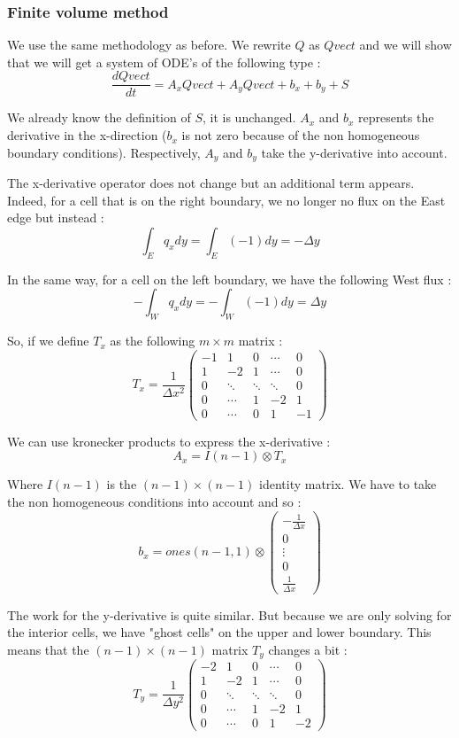 \subsubsection{Finite volume method}
We use the same methodology as before. We rewrite $Q$ as $Qvect$ and we will show that we will get a system of ODE's of the following type : 
$$\frac{dQvect}{dt} = A_xQvect+A_yQvect+b_x+b_y+S$$

We already know the definition of $S$, it is unchanged. $A_x$ and $b_x$ represents the derivative in the x-direction ($b_x$ is not zero because of the non homogeneous boundary conditions). Respectively, $A_y$ and $b_y$ take the y-derivative into account.

The x-derivative operator does not change but an additional term appears. Indeed, for a cell that is on the right boundary, we no longer no flux on the East edge but instead : 
$$\int_E q_xdy = \int_E (-1)dy = -\Delta y$$ 

In the same way, for a cell on the left boundary, we have the following West flux :
$$-\int_Wq_xdy=-\int_W(-1)dy = \Delta y$$

So, if we define $T_x$ as the following $m\times m$ matrix :
$$T_x = \frac{1}{\Delta x^2}\left(\begin{array}{ccccc}
-1 & 1 & 0 & \cdots & 0 \\ 
1 & -2 & 1 & \cdots & 0 \\ 
0& \ddots & \ddots & \ddots & 0 \\ 
0 & \cdots & 1 & -2 & 1 \\
0 & \cdots & 0 & 1 & -1
\end{array}\right) $$

We can use kronecker products to express the x-derivative :
$$A_x = I(n-1)\otimes T_x$$

Where $I(n-1)$ is the $(n-1)\times (n-1)$ identity matrix. We have to take the non homogeneous conditions into account and so :
$$b_x = ones(n-1,1) \otimes \left(\begin{array}{c}
-\frac{1}{\Delta x} \\ 
0 \\ 
\vdots \\ 
0 \\ 
\frac{1}{\Delta x}
\end{array}\right)$$

The work for the y-derivative is quite similar. But because we are only solving for the interior cells, we have "ghost cells" on the upper and lower boundary. This means that the $(n-1)\times (n-1)$ matrix $T_y$ changes a bit : 
$$T_y = \frac{1}{\Delta y^2}\left(\begin{array}{ccccc}
-2 & 1 & 0 & \cdots & 0 \\ 
1 & -2 & 1 & \cdots & 0 \\ 
0& \ddots & \ddots & \ddots & 0 \\ 
0 & \cdots & 1 & -2 & 1 \\
0 & \cdots & 0 & 1 & -2
\end{array}\right) $$

